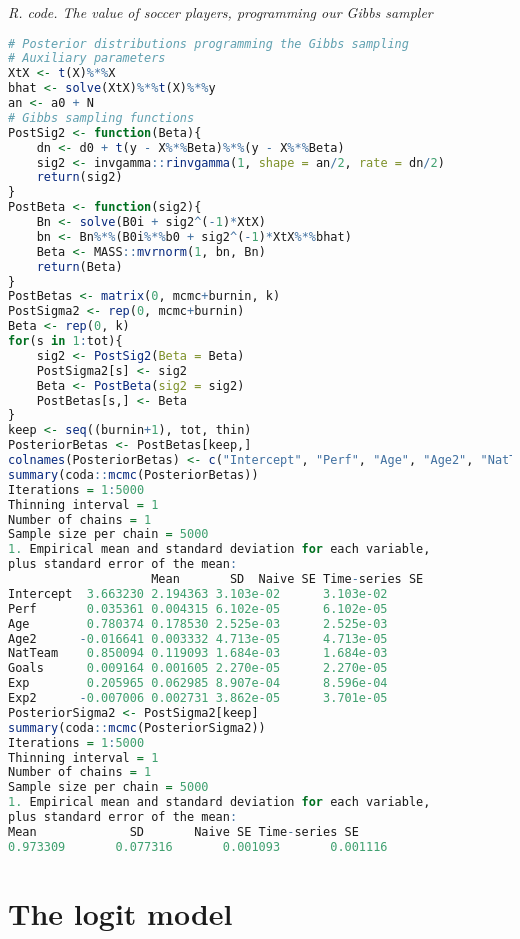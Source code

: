 \begin{tcolorbox}[enhanced,width=4.67in,center upper,
	fontupper=\large\bfseries,drop shadow southwest,sharp corners]
	\textit{R. code. The value of soccer players, programming our Gibbs sampler}
	\begin{VF}
		\begin{lstlisting}[language=R]		
# Posterior distributions programming the Gibbs sampling
# Auxiliary parameters
XtX <- t(X)%*%X
bhat <- solve(XtX)%*%t(X)%*%y
an <- a0 + N
# Gibbs sampling functions
PostSig2 <- function(Beta){
	dn <- d0 + t(y - X%*%Beta)%*%(y - X%*%Beta)
	sig2 <- invgamma::rinvgamma(1, shape = an/2, rate = dn/2)
	return(sig2)
}
PostBeta <- function(sig2){
	Bn <- solve(B0i + sig2^(-1)*XtX)
	bn <- Bn%*%(B0i%*%b0 + sig2^(-1)*XtX%*%bhat)
	Beta <- MASS::mvrnorm(1, bn, Bn)
	return(Beta)
}
PostBetas <- matrix(0, mcmc+burnin, k)
PostSigma2 <- rep(0, mcmc+burnin)
Beta <- rep(0, k)
for(s in 1:tot){
	sig2 <- PostSig2(Beta = Beta)
	PostSigma2[s] <- sig2
	Beta <- PostBeta(sig2 = sig2)
	PostBetas[s,] <- Beta
}
keep <- seq((burnin+1), tot, thin)
PosteriorBetas <- PostBetas[keep,]
colnames(PosteriorBetas) <- c("Intercept", "Perf", "Age", "Age2", "NatTeam", "Goals", "Exp", "Exp2")
summary(coda::mcmc(PosteriorBetas))
Iterations = 1:5000
Thinning interval = 1 
Number of chains = 1 
Sample size per chain = 5000 
1. Empirical mean and standard deviation for each variable,
plus standard error of the mean:
					Mean       SD  Naive SE Time-series SE
Intercept  3.663230 2.194363 3.103e-02      3.103e-02
Perf       0.035361 0.004315 6.102e-05      6.102e-05
Age        0.780374 0.178530 2.525e-03      2.525e-03
Age2      -0.016641 0.003332 4.713e-05      4.713e-05
NatTeam    0.850094 0.119093 1.684e-03      1.684e-03
Goals      0.009164 0.001605 2.270e-05      2.270e-05
Exp        0.205965 0.062985 8.907e-04      8.596e-04
Exp2      -0.007006 0.002731 3.862e-05      3.701e-05
PosteriorSigma2 <- PostSigma2[keep]
summary(coda::mcmc(PosteriorSigma2))
Iterations = 1:5000
Thinning interval = 1 
Number of chains = 1 
Sample size per chain = 5000 
1. Empirical mean and standard deviation for each variable,
plus standard error of the mean:
Mean             SD       Naive SE Time-series SE 
0.973309       0.077316       0.001093       0.001116 
\end{lstlisting}
	\end{VF}
\end{tcolorbox} 

\section{The logit model}\label{sec62}


